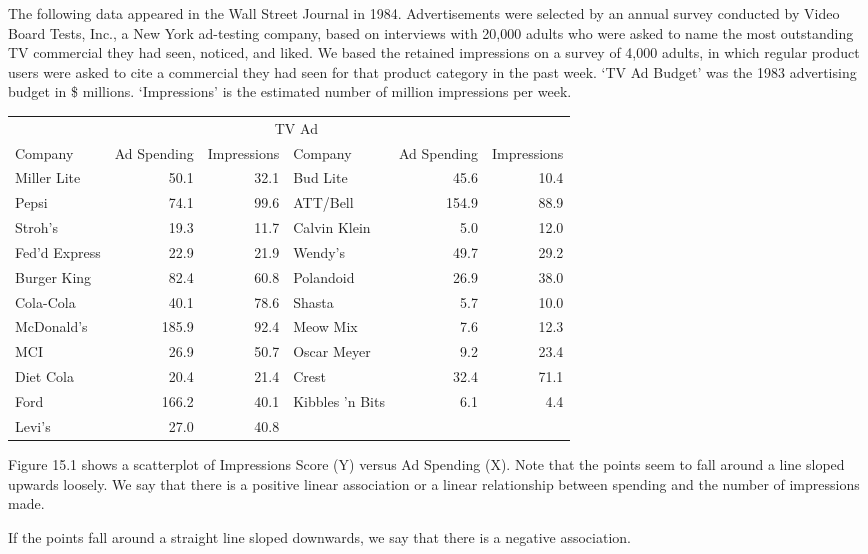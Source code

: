 \documentclass[11pt]{book}\usepackage[]{graphicx}\usepackage[]{color}
\begin{document}
The following data appeared in the Wall Street Journal in 1984.  Advertisements were selected by an annual survey conducted by Video Board Tests, Inc., a New York ad-testing company, based on interviews with 20,000 adults who were asked to name the most outstanding TV commercial they had seen, noticed, and liked. We based the retained impressions on a survey of 4,000 adults, in which regular product users were asked to cite a commercial they had seen for that product category in the past week.  `TV Ad Budget' was the 1983 advertising budget in \$ millions.  `Impressions' is the estimated number of million impressions per week.

\begin{table}[ht]
\centering 
\begin{tabular}{@{} lrr | lrr @{}} \hline
& \multicolumn{4}{c}{TV Ad} \\
Company & Ad Spending & Impressions & Company & Ad Spending & Impressions \\ \hline
Miller Lite & 50.1 & 32.1 & Bud Lite & 45.6 & 10.4\\
Pepsi & 74.1 & 99.6 & ATT/Bell & 154.9 & 88.9 \\
Stroh's & 19.3 & 11.7 & Calvin Klein & 5.0 & 12.0\\
Fed'd Express & 22.9 & 21.9 & Wendy's & 49.7 & 29.2\\
Burger King & 82.4 & 60.8 & Polandoid & 26.9 & 38.0\\
Cola-Cola & 40.1 & 78.6 & Shasta & 5.7 & 10.0\\
McDonald's & 185.9 & 92.4 & Meow Mix & 7.6 & 12.3\\
MCI & 26.9 & 50.7 & Oscar Meyer & 9.2 & 23.4\\
Diet Cola & 20.4 & 21.4 & Crest & 32.4 & 71.1\\
Ford & 166.2 & 40.1 & Kibbles 'n Bits & 6.1 & 4.4\\
Levi's & 27.0 & 40.8 \\ \hline
\end{tabular}
\end{table}

Figure 15.1 shows a scatterplot of Impressions Score (Y) versus Ad Spending (X). Note that the points seem to fall around a line sloped upwards loosely.  We say that there is a positive linear association or a linear relationship between spending and the number of impressions made.  

If the points fall around a straight line sloped downwards, we say that there is a negative association.
\end{document}
